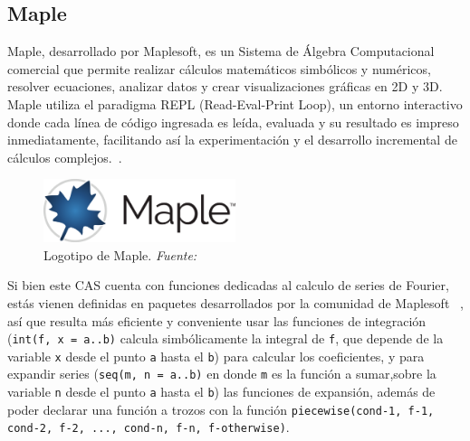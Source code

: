 \subsection{Maple}
Maple, desarrollado por Maplesoft, es un Sistema de Álgebra Computacional comercial que permite realizar cálculos matemáticos simbólicos y numéricos, resolver ecuaciones, analizar datos y crear visualizaciones gráficas en 2D y 3D. Maple utiliza el paradigma REPL (Read-Eval-Print Loop), un entorno interactivo donde cada línea de código ingresada es leída, evaluada y su resultado es impreso inmediatamente, facilitando así la experimentación y el desarrollo incremental de cálculos complejos.~\cite{maple2024}.
\begin{figure}[H]
	\centering
	\includegraphics[width=0.5\textwidth]{img/chapter02/logo_maple.png}
	\caption[Logotipo de Maple.]{Logotipo de Maple. \textit{Fuente: ~\cite{maple2024}}}
	\label{fig:logo-maple}  %
\end{figure}
Si bien este CAS cuenta con funciones dedicadas al calculo de series de Fourier, estás vienen definidas en paquetes desarrollados por la comunidad de Maplesoft ~\cite{mapleFourier}, así que resulta más eficiente y conveniente usar las funciones de integración (\texttt{int(f, x = a..b)} calcula simbólicamente la integral de \texttt{f}, que depende de la variable \texttt{x} desde el punto \texttt{a} hasta el \texttt{b}) para calcular los coeficientes, y para expandir series (\texttt{seq(m, n = a..b)} en donde \texttt{m} es la función a sumar,sobre la variable \texttt{n} desde el punto \texttt{a} hasta el \texttt{b}) las funciones de expansión, además de poder declarar una función a trozos con la función \texttt{piecewise(cond-1, f-1, cond-2, f-2, ..., cond-n, f-n, f-otherwise)}.

